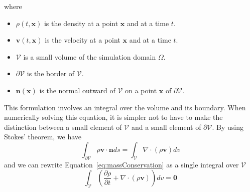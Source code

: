 where
\begin{itemize}
	\item $\rho(t,\mathbf{x})$ is the density at a point $\mathbf{x}$ and at a time $t$.
	\item $\mathbf{v}(t,\mathbf{x})$ is the velocity at a point $\mathbf{x}$ and at a time $t$.
	\item $\mathcal{V}$ is a small volume of the simulation domain $\Omega$.
	\item $\mathcal{\partial V}$ is the border of $\mathcal{V}$.
	\item $\mathbf{n}(\mathbf{x})$ is the normal outward of $\mathcal{V}$ on a point $\mathbf{x}$ of $\partial\mathcal{V}$.
\end{itemize}
This formulation involves an integral over the volume and its boundary.
When numerically solving this equation, it is simpler not to have to make the distinction between a small element of $\mathcal{V}$ and a small element of $\partial \mathcal{V}$.
By using Stokes' theorem, we have
\begin{equation}
\displaystyle 
\int_{\partial \mathcal{V}} \rho \mathbf{v} \cdot \mathbf{n} ds =
\int_{\mathcal{V}} \nabla \cdot \left( \rho \mathbf{v} \right) dv
\end{equation}
and we can rewrite Equation~\eqref{eq:massConservation} as a single integral over $\mathcal{V}$
\begin{equation}
\label{eq:volumetricMassConservation}
\displaystyle 
\int_{\mathcal{V}} 
\left( \frac{\partial \rho}{\partial t} + \nabla \cdot \left( \rho  \mathbf{v} \right) \right) dv = \mathbf{0}
\end{equation}

